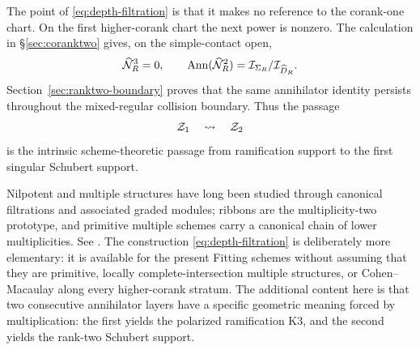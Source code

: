 The point of \eqref{eq:depth-filtration} is that it makes no reference
to the corank-one chart.  On the first higher-corank chart the next
power is nonzero.  The calculation in \S\ref{sec:coranktwo} gives,
on the simple-contact open,
\[
 \widehat{\mathcal N}_R^3=0,\qquad
 \operatorname{Ann}(\widehat{\mathcal N}_R^2)=\mathcal I_{\Sigma_R}/\mathcal I_{\widehat D_R}.
\]
Section~\ref{sec:ranktwo-boundary} proves that the same annihilator
identity persists throughout the mixed-regular collision boundary.
Thus the passage
\[
 \mathcal Z_1\quad\leadsto\quad\mathcal Z_2
\]
is the intrinsic scheme-theoretic passage from ramification support to
the first singular Schubert support.

\begin{remark}\label{rem:multiple-filtrations}
Nilpotent and multiple structures have long been studied through
canonical filtrations and associated graded modules; ribbons are the
multiplicity-two prototype, and primitive multiple schemes carry a
canonical chain of lower multiplicities.  See
\cite{BayerEisenbud,Manolache,Drezet}.  The construction
\eqref{eq:depth-filtration} is deliberately more elementary: it is
available for the present Fitting schemes without assuming that they
are primitive, locally complete-intersection multiple structures, or
Cohen--Macaulay along every higher-corank stratum.  The additional
content here is that two consecutive annihilator layers have a
specific geometric meaning forced by multiplication: the first yields
the polarized ramification K3, and the second yields the rank-two
Schubert support.
\end{remark}
